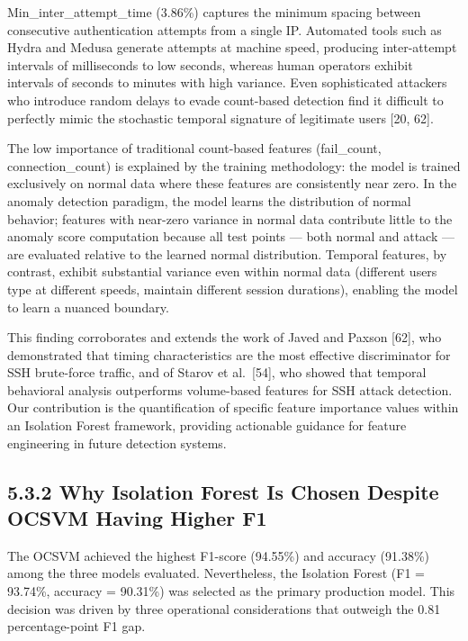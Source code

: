 \documentclass[
  a4paper]{report}
\begin{document}
Min\_inter\_attempt\_time (3.86\%) captures the minimum spacing between
consecutive authentication attempts from a single IP. Automated tools
such as Hydra and Medusa generate attempts at machine speed, producing
inter-attempt intervals of milliseconds to low seconds, whereas human
operators exhibit intervals of seconds to minutes with high variance.
Even sophisticated attackers who introduce random delays to evade
count-based detection find it difficult to perfectly mimic the
stochastic temporal signature of legitimate users {[}20, 62{]}.

The low importance of traditional count-based features (fail\_count,
connection\_count) is explained by the training methodology: the model
is trained exclusively on normal data where these features are
consistently near zero. In the anomaly detection paradigm, the model
learns the distribution of normal behavior; features with near-zero
variance in normal data contribute little to the anomaly score
computation because all test points --- both normal and attack --- are
evaluated relative to the learned normal distribution. Temporal
features, by contrast, exhibit substantial variance even within normal
data (different users type at different speeds, maintain different
session durations), enabling the model to learn a nuanced boundary.

This finding corroborates and extends the work of Javed and Paxson
{[}62{]}, who demonstrated that timing characteristics are the most
effective discriminator for SSH brute-force traffic, and of Starov et
al.~{[}54{]}, who showed that temporal behavioral analysis outperforms
volume-based features for SSH attack detection. Our contribution is the
quantification of specific feature importance values within an Isolation
Forest framework, providing actionable guidance for feature engineering
in future detection systems.

\subsection{5.3.2 Why Isolation Forest Is Chosen Despite OCSVM Having
Higher
F1}\label{why-isolation-forest-is-chosen-despite-ocsvm-having-higher-f1}

The OCSVM achieved the highest F1-score (94.55\%) and accuracy (91.38\%)
among the three models evaluated. Nevertheless, the Isolation Forest (F1
= 93.74\%, accuracy = 90.31\%) was selected as the primary production
model. This decision was driven by three operational considerations that
outweigh the 0.81 percentage-point F1 gap.
\end{document}

